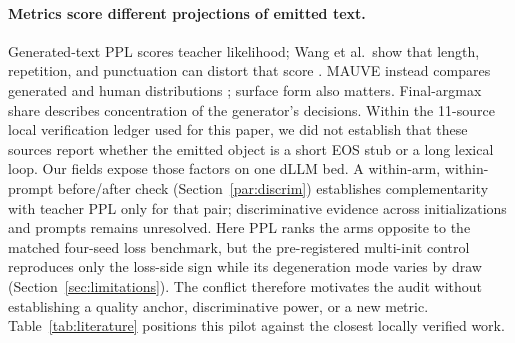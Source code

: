 \documentclass{article}
\begin{document}
\paragraph{Metrics score different projections of emitted text.}
Generated-text PPL scores teacher likelihood; Wang et al.\ show that length,
repetition, and punctuation can distort that score \citep{wang2022ppl}.
MAUVE instead compares generated and human distributions
\citep{pillutla2021mauve}; surface form also matters.  Final-argmax share
describes concentration of the generator's decisions.  Within the 11-source
local verification ledger used for this paper, we did not establish that these
sources report whether the emitted object is a short EOS stub or a long lexical
loop.  Our fields expose those factors on one dLLM bed.  A within-arm,
within-prompt before/after
check (Section~\ref{par:discrim}) establishes complementarity with teacher PPL
only for that pair; discriminative evidence across initializations and prompts
remains unresolved.  Here PPL ranks the arms opposite to the matched four-seed
loss benchmark, but the pre-registered multi-init control reproduces only the
loss-side sign while its degeneration mode varies by draw
(Section~\ref{sec:limitations}).  The conflict therefore motivates the audit
without establishing a quality anchor, discriminative power, or a new metric.
Table~\ref{tab:literature} positions this pilot against the closest locally
verified work.
\end{document}

